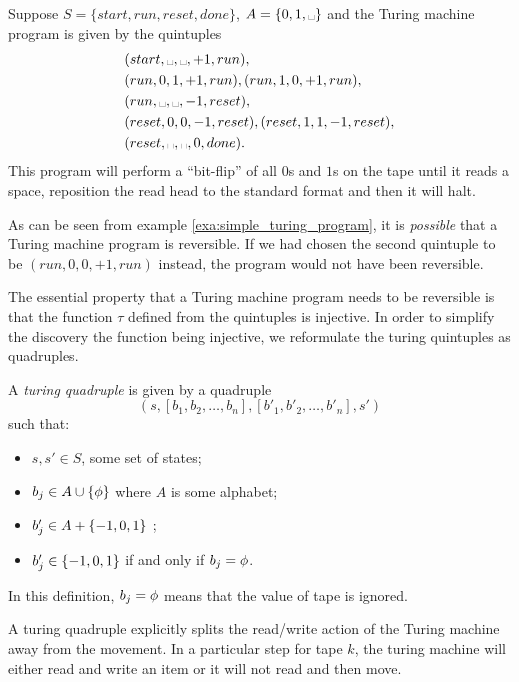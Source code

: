 \begin{example}\label{exa:simple_turing_program}
  Suppose $S=\{start,run,reset,done\}$, $A=\{0,1,\blank\}$ and the Turing machine
  program is given by the quintuples
  \begin{align*}
    &(start,\blank,\blank,+1,run),\\
    &(run,0,1,+1,run), (run,1,0,+1,run),\\
    &(run,\blank,\blank,-1,reset),\\
    &(reset,0,0,-1,reset),(reset,1,1,-1,reset),\\
    &(reset,\blank,\blank,0,done).
  \end{align*}
  This program will perform a ``bit-flip'' of all $0$s and $1$s on the tape
  until it reads a space, reposition the read head to the standard format
  and then it will halt.
\end{example}

As can be seen from example \vref{exa:simple_turing_program}, it is \emph{possible}
that a Turing machine program is reversible. If we had chosen the second
quintuple to be $(run,0,0,+1,run)$ instead, the program would not have been
reversible.

The essential property that a Turing machine program needs to be reversible
is that the function $\tau$ defined from the quintuples is injective. In order
to simplify the discovery the function being injective, we reformulate the
turing quintuples as quadruples.

\begin{definition}\label{def:turing_quadruple}
  A \emph{turing quadruple} is given by a quadruple
  \[(s,[b_1,b_2,\ldots,b_n],[b'_1,b'_2,\ldots,b'_n],s')\]
  such that:
  \begin{itemize}
    \item $s,s'\in S$, some set of states;
    \item $b_j\in A  \cup \{\phi\}$ where $A$ is some alphabet;
    \item $b'_j\in A  + \{-1,0,1\}$ ;
    \item $b'_j \in \{-1,0,1\}$ if and only if $b_j = \phi$.
  \end{itemize}
  In this definition, $b_j = \phi$ means that the value of tape
  \jay is ignored.
\end{definition}

A turing quadruple explicitly splits the read/write action of the
Turing machine away from the movement. In a particular step for
tape $k$, the
turing machine will either read and write an item or it will not
read and then move.

